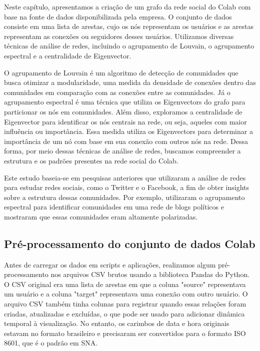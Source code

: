 Neste capítulo, apresentamos a criação de um grafo da rede social do Colab com base na fonte de dados disponibilizada pela empresa. O conjunto de dados consiste em uma lista de arestas, cujo os nós representam os usuários e as arestas representam as conexões ou seguidores desses usuários. Utilizamos diversas técnicas de análise de redes, incluindo o agrupamento de Louvain, o agrupamento espectral e a centralidade de Eigenvector.

O agrupamento de Louvain é um algoritmo de detecção de comunidades que busca otimizar a modularidade, uma medida da densidade de conexões dentro das comunidades em comparação com as conexões entre as comunidades. Já o agrupamento espectral é uma técnica que utiliza os Eigenvectors do grafo para particionar os nós em comunidades. Além disso, exploramos a centralidade de Eigenvector para identificar os nós centrais na rede, ou seja, aqueles com maior influência ou importância. Essa medida utiliza os Eigenvectors para determinar a importância de um nó com base em sua conexão com outros nós na rede. Dessa forma, por meio dessas técnicas de análise de redes, buscamos compreender a estrutura e os padrões presentes na rede social do Colab.

Este estudo baseia-se em pesquisas anteriores que utilizaram a análise de redes para estudar redes sociais, como o Twitter e o Facebook, a fim de obter insights sobre a estrutura dessas comunidades. Por exemplo,  utilizaram o agrupamento espectral para identificar comunidades em uma rede de blogs políticos e mostraram que essas comunidades eram altamente polarizadas.

\subsection*{Pré-processamento do conjunto de dados Colab}
\label{sec:preprocessing}

Antes de carregar os dados em scripts e aplicações, realizamos algum pré-processamento nos arquivos CSV brutos usando a biblioteca Pandas do Python. O CSV original era uma lista de arestas em que a coluna "source" representava um usuário e a coluna "target" representava uma conexão com outro usuário. O arquivo CSV também tinha colunas para registrar quando essas relações foram criadas, atualizadas e excluídas, o que pode ser usado para adicionar dinâmica temporal à visualização. No entanto, os carimbos de data e hora originais estavam no formato brasileiro e precisaram ser convertidos para o formato ISO 8601, que é o padrão em SNA.

